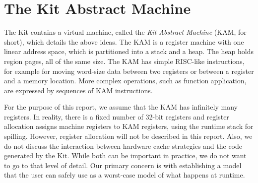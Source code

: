 \documentclass[12pt]{book}
\begin{document}
\section{The Kit Abstract Machine}
The Kit contains a virtual machine, called
the {\em Kit Abstract Machine} (KAM, for short), which details the
above ideas. The KAM is a register machine with one linear address
space, which is partitioned into a stack and a heap. The heap holds
region pages, all of the same size.  The KAM has simple RISC-like
instructions, for example for moving word-size data between two
registers or between a register and a memory location.  More complex
operations, such as function application, are expressed by sequences
of KAM instructions.

For the purpose of this report,
we assume that the KAM has infinitely many registers.
In reality, there is a fixed number of 32-bit registers and
register allocation assigns machine registers to KAM registers, using the runtime
stack for spilling. However, register allocation will not be described in this report.
Also, we do not discuss the interaction between hardware cache strategies and
the code generated by the Kit. While both can be important in practice, we do not want
to go to that level of detail. Our primary concern is with establishing a model that
the user can safely use as a worst-case model of what happens at runtime.
\end{document}
